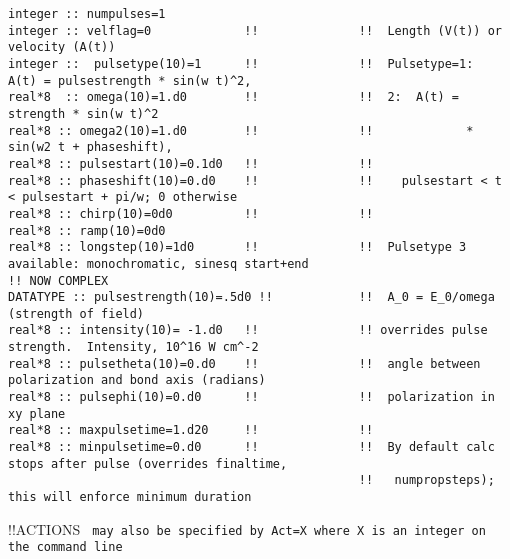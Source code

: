 \begin{verbatim}
integer :: numpulses=1
integer :: velflag=0             !!              !!  Length (V(t)) or velocity (A(t))       
integer ::  pulsetype(10)=1      !!              !!  Pulsetype=1:  A(t) = pulsestrength * sin(w t)^2,
real*8  :: omega(10)=1.d0        !!              !!  2:  A(t) = strength * sin(w t)^2 
real*8 :: omega2(10)=1.d0        !!              !!             * sin(w2 t + phaseshift),
real*8 :: pulsestart(10)=0.1d0   !!              !!   
real*8 :: phaseshift(10)=0.d0    !!              !!    pulsestart < t < pulsestart + pi/w; 0 otherwise
real*8 :: chirp(10)=0d0          !!              !!
real*8 :: ramp(10)=0d0
real*8 :: longstep(10)=1d0       !!              !!  Pulsetype 3 available: monochromatic, sinesq start+end
!! NOW COMPLEX
DATATYPE :: pulsestrength(10)=.5d0 !!            !!  A_0 = E_0/omega (strength of field)  
real*8 :: intensity(10)= -1.d0   !!              !! overrides pulse strength.  Intensity, 10^16 W cm^-2 
real*8 :: pulsetheta(10)=0.d0    !!              !!  angle between polarization and bond axis (radians)
real*8 :: pulsephi(10)=0.d0      !!              !!  polarization in xy plane
real*8 :: maxpulsetime=1.d20     !!              !!  
real*8 :: minpulsetime=0.d0      !!              !!  By default calc stops after pulse (overrides finaltime,
                                                 !!   numpropsteps); this will enforce minimum duration
\end{verbatim} 
!!{\large \quad ACTIONS} \verb# may also be specified by Act=X where X is an integer on the command line #
